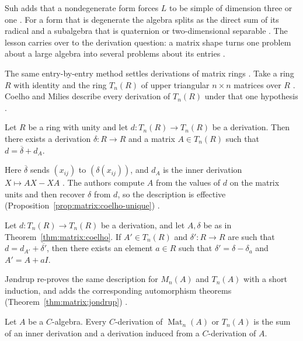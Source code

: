 Suh adds that a nondegenerate form forces $L$ to be simple of dimension three
or one \cite[Corollary, p.~257]{Suh1969}. For a form that is degenerate the
algebra splits as the direct sum of its radical and a subalgebra that is
quaternion or two-dimensional separable \cite[p.~255]{Suh1969}. The lesson
carries over to the derivation question: a matrix shape turns one problem about
a large algebra into several problems about its entries \cite[p.~255]{Suh1969}.

The same entry-by-entry method settles derivations of matrix rings
\cite[p.~263]{CoelhoMilies1993}. Take a ring
$R$ with identity and the ring $T_n(R)$ of upper triangular $n\times n$ matrices
over $R$ \cite[p.~263]{CoelhoMilies1993}. Coelho and Milies describe every
derivation of $T_n(R)$ under that one hypothesis
\cite[p.~263]{CoelhoMilies1993}.

\begin{theorem}\label{thm:matrix:coelho}
Let $R$ be a ring with unity and let $d\colon T_n(R)\to T_n(R)$ be a
derivation. Then there exists a derivation $\delta\colon R\to R$ and a matrix
$A\in T_n(R)$ such that $d=\overline{\delta}+d_A$.
\end{theorem}

Here $\overline{\delta}$ sends $(x_{ij})$ to $(\delta(x_{ij}))$, and $d_A$ is
the inner derivation $X\mapsto AX-XA$ \cite[p.~263]{CoelhoMilies1993}. The
authors compute $A$ from the values of $d$ on the matrix units and then recover
$\delta$ from $d$, so the description is effective (Proposition~\ref{prop:matrix:coelho-unique})
\cite[p.~264]{CoelhoMilies1993}.\begin{proposition}\label{prop:matrix:coelho-unique}
Let $d\colon T_n(R)\to T_n(R)$ be a derivation, and let $A,\delta$ be as in
Theorem~\ref{thm:matrix:coelho}. If $A'\in T_n(R)$ and
$\delta'\colon R\to R$ are such that $d=d_{A'}+\overline{\delta'}$, then there
exists an element $a\in R$ such that $\delta'=\delta-\delta_a$ and
$A'=A+aI$.
\end{proposition}

Jøndrup re-proves the same description for $M_n(A)$ and $T_n(A)$ with a short
induction, and adds the corresponding automorphism theorems (Theorem~\ref{thm:matrix:jondrup})
\cite[p.~205]{Jondrup1995}.\begin{theorem}\label{thm:matrix:jondrup}
Let $A$ be a $C$-algebra. Every $C$-derivation of $\operatorname{Mat}_n(A)$ or
$T_n(A)$ is the sum of an inner derivation and a derivation induced from a
$C$-derivation of $A$.
\end{theorem}

